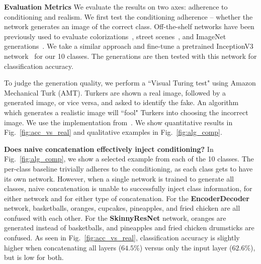 
\vspace{2mm} \noindent \textbf{Evaluation Metrics} We evaluate the results on two axes: adherence to conditioning and realism. We first test the conditioning adherence -- whether the network generates an image of the correct class. Off-the-shelf networks have been previously used to evaluate colorizations~\cite{zhang2016colorful}, street scenes~\cite{isola2016image2image, wang2017high}, and ImageNet generations~\cite{salimans2016improved}. We take a similar approach and fine-tune a pretrained InceptionV3 network~\cite{szegedy2016rethinking} for our 10 classes. The generations are then tested with this network for classification accuracy.

To judge the generation quality, we perform a ``Visual Turing test" using Amazon Mechanical Turk (AMT). Turkers are shown a real image, followed by a generated image, or vice versa, and asked to identify the fake. An algorithm which generates a realistic image will ``fool" Turkers into choosing the incorrect image. We use the implementation from~\cite{zhang2016colorful}. We show quantitative results in Fig.~\ref{fig:acc_vs_real} and qualitative examples in Fig.~\ref{fig:alg_comp}.

\vspace{2mm} \noindent \textbf{Does naive concatenation effectively inject conditioning?} In Fig.~\ref{fig:alg_comp}, we show a selected example from each of the 10 classes. The per-class baseline trivially adheres to the conditioning, as each class gets to have its own network. However, when a single network is trained to generate all classes, naive concatenation is unable to successfully inject class information, for either network and for either type of concatenation. For the \textbf{EncoderDecoder} network, basketballs, oranges, cupcakes, pineapples, and fried chicken are all confused with each other. For the \textbf{SkinnyResNet} network, oranges are generated instead of basketballs, and pineapples and fried chicken drumsticks are confused. As seen in Fig.~\ref{fig:acc_vs_real}, classification accuracy is slightly higher when concatenating all layers ($64.5\%$) versus only the input layer ($62.6\%$), but is low for both.

